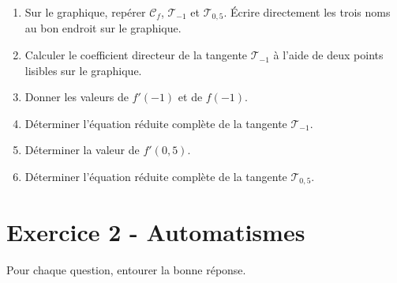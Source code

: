 \documentclass[11pt,a4paper]{article}
\begin{document}
\begin{enumerate}[label=\textbf{\arabic*)}, leftmargin=0.75cm, itemsep=0.18cm, topsep=0.1cm]
    \item Sur le graphique, repérer $\mathcal C_f$, $\mathcal T_{-1}$ et $\mathcal T_{0{,}5}$. Écrire directement les trois noms au bon endroit sur le graphique.
    \item Calculer le coefficient directeur de la tangente $\mathcal T_{-1}$ à l'aide de deux points lisibles sur le graphique.
    \item Donner les valeurs de $f'(-1)$ et de $f(-1)$.
    \item Déterminer l'équation réduite complète de la tangente $\mathcal T_{-1}$.
    \item Déterminer la valeur de $f'(0{,}5)$.
    \item Déterminer l'équation réduite complète de la tangente $\mathcal T_{0{,}5}$.
\end{enumerate}

\newpage

\section*{Exercice 2 - Automatismes}

Pour chaque question, entourer la bonne réponse.
\end{document}
